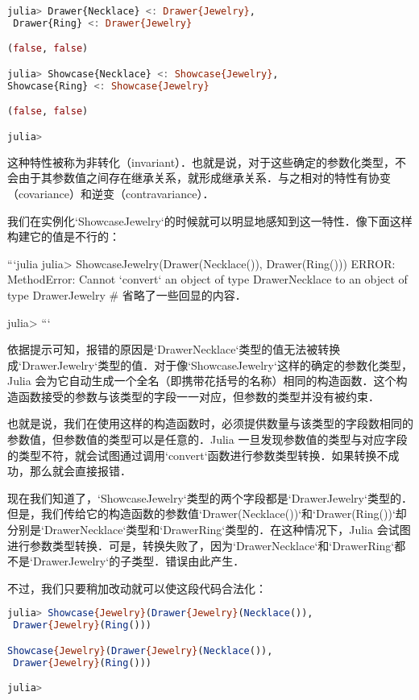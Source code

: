 \begin{lstlisting}[language=julia]
julia> Drawer{Necklace} <: Drawer{Jewelry},
 Drawer{Ring} <: Drawer{Jewelry}

(false, false)

julia> Showcase{Necklace} <: Showcase{Jewelry}, 
Showcase{Ring} <: Showcase{Jewelry}

(false, false)

julia> 
\end{lstlisting}

这种特性被称为非转化（invariant）．也就是说，对于这些确定的参数化类型，不会由于其参数值之间存在继承关系，就形成继承关系．与之相对的特性有协变（covariance）和逆变（contravariance）．

我们在实例化`Showcase{Jewelry}`的时候就可以明显地感知到这一特性．像下面这样构建它的值是不行的：

```julia
julia> Showcase{Jewelry}(Drawer(Necklace()), Drawer(Ring()))
ERROR: MethodError: Cannot `convert` an object of type Drawer{Necklace} 
to an object of type Drawer{Jewelry}
# 省略了一些回显的内容．

julia> 
```

依据提示可知，报错的原因是`Drawer{Necklace}`类型的值无法被转换成`Drawer{Jewelry}`类型的值．对于像`Showcase{Jewelry}`这样的确定的参数化类型，Julia 会为它自动生成一个全名（即携带花括号的名称）相同的构造函数．这个构造函数接受的参数与该类型的字段一一对应，但参数的类型并没有被约束．

也就是说，我们在使用这样的构造函数时，必须提供数量与该类型的字段数相同的参数值，但参数值的类型可以是任意的．Julia 一旦发现参数值的类型与对应字段的类型不符，就会试图通过调用`convert`函数进行参数类型转换．如果转换不成功，那么就会直接报错．

现在我们知道了，`Showcase{Jewelry}`类型的两个字段都是`Drawer{Jewelry}`类型的．但是，我们传给它的构造函数的参数值`Drawer(Necklace())`和`Drawer(Ring())`却分别是`Drawer{Necklace}`类型和`Drawer{Ring}`类型的．在这种情况下，Julia 会试图进行参数类型转换．可是，转换失败了，因为`Drawer{Necklace}`和`Drawer{Ring}`都不是`Drawer{Jewelry}`的子类型．错误由此产生．

不过，我们只要稍加改动就可以使这段代码合法化：

\begin{lstlisting}[language=julia]
julia> Showcase{Jewelry}(Drawer{Jewelry}(Necklace()),
 Drawer{Jewelry}(Ring()))

Showcase{Jewelry}(Drawer{Jewelry}(Necklace()),
 Drawer{Jewelry}(Ring()))

julia> 
\end{lstlisting}

